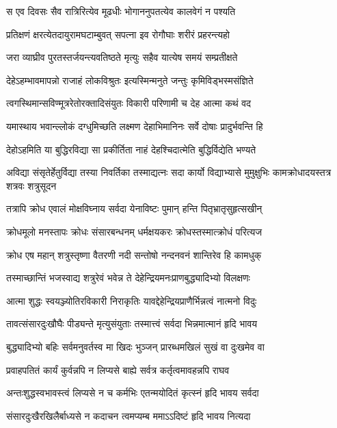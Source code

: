 \twolineshloka
{स एव दिवसः सैव रात्रिरित्येव मूढधीः}
{भोगाननुपतत्येव कालवेगं न पश्यति} %

\twolineshloka
{प्रतिक्षणं क्षरत्येतदायुरामघटाम्बुवत्}
{सपत्ना इव रोगौघाः शरीरं प्रहरन्त्यहो} %

\twolineshloka
{जरा व्याघ्रीव पुरतस्तर्जयन्त्यवतिष्ठते}
{मृत्युः सहैव यात्येष समयं सम्प्रतीक्षते} %

\twolineshloka
{देहेऽहम्भावमापन्नो राजाहं लोकविश्रुतः}
{इत्यस्मिन्मनुते जन्तुः कृमिविड्भस्मसंज्ञिते} %

\twolineshloka
{त्वगस्थिमान्सविण्मूत्ररेतोरक्तादिसंयुतः}
{विकारी परिणामी च देह आत्मा कथं वद} %

\twolineshloka
{यमास्थाय भवान्ल्लोकं दग्धुमिच्छति लक्ष्मण}
{देहाभिमानिनः सर्वे दोषाः प्रादुर्भवन्ति हि} %

\twolineshloka
{देहोऽहमिति या बुद्धिरविद्या सा प्रकीर्तिता}
{नाहं देहश्चिदात्मेति बुद्धिर्विद्येति भण्यते} %

\threelineshloka
{अविद्या संसृतेर्हेतुर्विद्या तस्या निवर्तिका}
{तस्माद्यत्नः सदा कार्यो विद्याभ्यासे मुमुक्षुभिः}
{कामक्रोधादयस्तत्र शत्रवः शत्रुसूदन} %

\twolineshloka
{तत्रापि क्रोध एवालं मोक्षविघ्नाय सर्वदा}
{येनाविष्टः पुमान् हन्ति पितृभ्रातृसुहृत्सखीन्} %

\twolineshloka
{क्रोधमूलो मनस्तापः क्रोधः संसारबन्धनम्}
{धर्मक्षयकरः क्रोधस्तस्मात्क्रोधं परित्यज} %

\twolineshloka
{क्रोध एष महान् शत्रुस्तृष्णा वैतरणी नदी}
{सन्तोषो नन्दनवनं शान्तिरेव हि कामधुक्} %

\twolineshloka
{तस्माच्छान्तिं भजस्वाद्य शत्रुरेवं भवेन्न ते}
{देहेन्द्रियमनःप्राणबुद्ध्यादिभ्यो विलक्षणः} %

\twolineshloka
{आत्मा शुद्धः स्वयञ्ज्योतिरविकारी निराकृतिः}
{यावद्देहेन्द्रियप्राणैर्भिन्नत्वं नात्मनो विदुः} %

\twolineshloka
{तावत्संसारदुःखौघैः पीड्यन्ते मृत्युसंयुताः}
{तस्मात्त्वं सर्वदा भिन्नमात्मानं हृदि भावय} %

\twolineshloka
{बुद्ध्यादिभ्यो बहिः सर्वमनुवर्तस्व मा खिदः}
{भुञ्जन् प्रारब्धमखिलं सुखं वा दुःखमेव वा} %

\twolineshloka
{प्रवाहपतितं कार्यं कुर्वन्नपि न लिप्यसे}
{बाह्ये सर्वत्र कर्तृत्वमावहन्नपि राघव} %

\twolineshloka
{अन्तःशुद्धस्वभावस्त्वं लिप्यसे न च कर्मभिः}
{एतन्मयोदितं कृत्स्नं हृदि भावय सर्वदा} %

\twolineshloka
{संसारदुःखैरखिलैर्बाध्यसे न कदाचन}
{त्वमप्यम्ब ममाऽऽदिष्टं हृदि भावय नित्यदा} %

